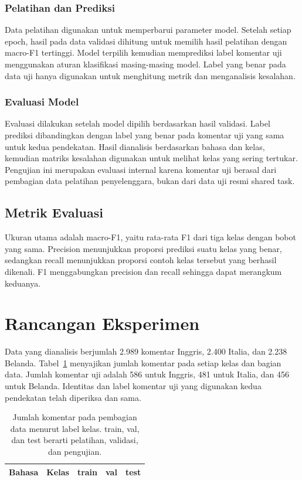\documentclass[11pt]{article}
\begin{document}
\subsubsection{Pelatihan dan Prediksi}
Data pelatihan digunakan untuk memperbarui parameter model. Setelah setiap epoch, hasil pada data validasi dihitung untuk memilih hasil pelatihan dengan macro-F1 tertinggi. Model terpilih kemudian memprediksi label komentar uji menggunakan aturan klasifikasi masing-masing model. Label yang benar pada data uji hanya digunakan untuk menghitung metrik dan menganalisis kesalahan.

\subsubsection{Evaluasi Model}
Evaluasi dilakukan setelah model dipilih berdasarkan hasil validasi. Label prediksi dibandingkan dengan label yang benar pada komentar uji yang sama untuk kedua pendekatan. Hasil dianalisis berdasarkan bahasa dan kelas, kemudian matriks kesalahan digunakan untuk melihat kelas yang sering tertukar. Pengujian ini merupakan evaluasi internal karena komentar uji berasal dari pembagian data pelatihan penyelenggara, bukan dari data uji resmi shared task.

\subsection{Metrik Evaluasi}
Ukuran utama adalah macro-F1, yaitu rata-rata F1 dari tiga kelas dengan bobot yang sama. Precision menunjukkan proporsi prediksi suatu kelas yang benar, sedangkan recall menunjukkan proporsi contoh kelas tersebut yang berhasil dikenali. F1 menggabungkan precision dan recall sehingga dapat merangkum keduanya.

\section{Rancangan Eksperimen}
Data yang dianalisis berjumlah 2.989 komentar Inggris, 2.400 Italia, dan 2.238 Belanda. Tabel~\ref{tab:data} menyajikan jumlah komentar pada setiap kelas dan bagian data. Jumlah komentar uji adalah 586 untuk Inggris, 481 untuk Italia, dan 456 untuk Belanda. Identitas dan label komentar uji yang digunakan kedua pendekatan telah diperiksa dan sama.

\begin{table}[t]
\centering
\small
\setlength{\tabcolsep}{3pt}
\begin{tabular}{llrrr}
\toprule
Bahasa & Kelas & train & val & test \\
\midrule

\end{tabular}
\caption{Jumlah komentar pada pembagian data menurut label kelas. train, val, dan test berarti pelatihan, validasi, dan pengujian.}
\label{tab:data}
\end{table}
\end{document}
